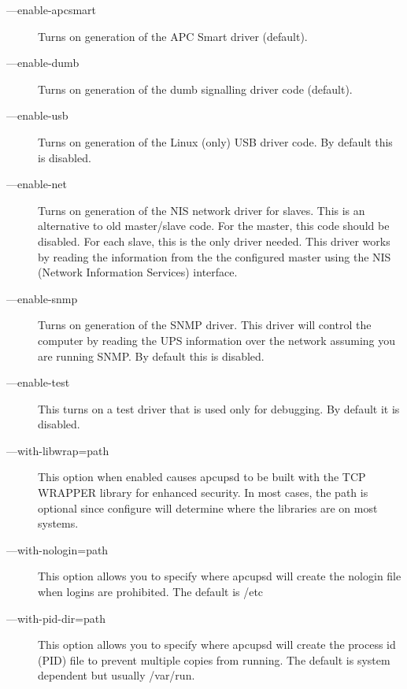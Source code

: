 \begin{description}
\item [{---}enable-apcsmart]
   Turns on generation of the APC Smart driver (default).  

\item [{---}enable-dumb]
   Turns on generation of the dumb signalling driver code (default).  

\item [{---}enable-usb]
   Turns on generation of the Linux (only) USB driver code. By default this is
disabled.  

\item [{---}enable-net]
   Turns on generation of the NIS network driver for slaves. This is an
alternative to old master/slave code. For the master, this code should be
disabled. For each slave, this is the only driver needed. This driver works by
reading the information from the the configured master using the NIS (Network
Information Services) interface.  

\item [{---}enable-snmp]
   Turns on generation of the SNMP driver. This driver will control the computer
by reading the UPS information over the network assuming you are running SNMP.
By default this is disabled.  

\item [{---}enable-test]
   This turns on a test driver that is used only for debugging. By default it is
disabled.  

\item [{---}with-libwrap=\lt{}path\gt{}]
   This option when enabled causes apcupsd to be built with the TCP WRAPPER
library for enhanced security. In most cases, the \lt{}path\gt{} is optional
since configure will determine where the libraries are on most systems.  

\item [{---}with-nologin=\lt{}path\gt{}]
   This option allows you to specify where apcupsd will create the nologin file
when logins are prohibited. The default is /etc  

\item [{---}with-pid-dir=\lt{}path\gt{}]
   This option allows you to specify where apcupsd will create the process id
(PID) file to prevent multiple copies from running. The default is system
dependent but usually /var/run.  


\end{description}
